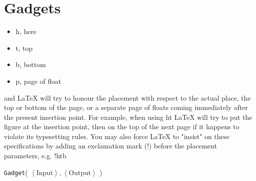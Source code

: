 \section{Gadgets}
\label{gadgets}

\begin{itemize}
\item h, here
\item t, top
\item b, bottom
\item p, page of float
\end{itemize}
and LaTeX will try to honour the placement with respect to the actual place, the top or bottom of the page,
or a separate page of floats coming immediately after the present insertion point. For example, when using
ht LaTeX will try to put the figure at the insertion point, then on the top of the next page if it happens
to violate its typesetting rules. You may also force LaTeX to "insist" on these specifications by adding an
exclamation mark (!) before the placement parameters, e.g. !htb

{ \tt Gadget}( $\left\langle \text{Input} \right\rangle, \left\langle \text{Output}  \right\rangle$ )

\newcommand{\warpunit}{{\tt Warp\_Unit}}
\newcommand{\prewarp}{{\tt Pre\_Warp}}
\newcommand{\firstwarp}{{\tt First\_Warp}}
\newcommand{\warpbridge}{{\tt Warp\_Bridge}}
\newcommand{\secondwarp}{{\tt Second\_Warp}}
\newcommand{\postwarp}{{\tt Post\_Warp}}

\newcommand{\dtop}{{\tt Digit\_Top}}
\newcommand{\dwriter}{{\tt Digit\_Writer}}
\newcommand{\dreader}{{\tt Digit\_Reader}}

\newcommand{\returnfromdonereadnextrow}{{\tt Return\_From\_Digit1\_Read\_Next\_Row}}
\newcommand{\returnfromdtworeadnextrow}{{\tt Return\_From\_Digit2\_Read\_Next\_Row}}
\newcommand{\returnfromdthreereadnextrow}{{\tt Return\_From\_Digit3\_Read\_Next\_Row}}

\newcommand{\returnfromdonereaddtwo}{{\tt Return\_From\_Digit1\_Read\_Digit2}}
\newcommand{\returnfromdonereaddtwocasetwo}{{\tt Return\_From\_Digit1\_Read\_Digit2\_Case2}}
\newcommand{\returnfromdtworeaddthree}{{\tt Return\_From\_Digit2\_Read\_Digit3}}
\newcommand{\returnfromdthreereaddone}{{\tt Return\_From\_Digit3\_Read\_Digit1}}

\newcommand{\inc}{{\tt carry}}

\newcommand{\dtopdonecasetwo}{{\tt Digit\_Top\_Digit1\_Case2}}
\newcommand{\dtopdtwocasetwo}{{\tt Digit\_Top\_Digit2\_Case2}}
\newcommand{\dtopdthreecasethree}{{\tt Digit\_Top\_Digit3\_Case3}}

